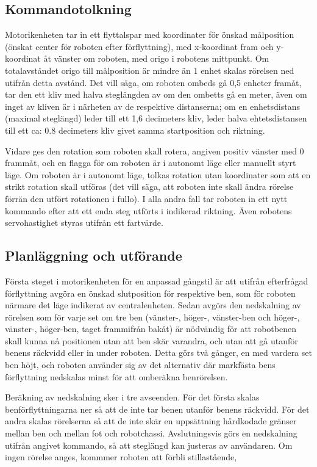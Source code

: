 \documentclass[a4paper,titlepage,12pt]{article}
\begin{document}
		\subsection{Kommandotolkning}
	Motorikenheten  tar in ett flyttalspar med koordinater för önskad målposition (önskat 
	center för roboten efter förflyttning), med x-koordinat fram och 
	y-koordinat åt vänster om roboten, med origo i robotens mittpunkt. Om totalavståndet 
	origo till målposition är mindre än 1 enhet skalas rörelsen ned utifrån detta avstånd. 
	Det vill säga, om roboten ombeds gå 0,5 enheter framåt, tar den ett kliv med halva 
	steglängden av om den ombetts gå en meter, även om inget av kliven är i närheten av 
	de respektive distanserna; om en enhetsdistans (maximal steglängd) leder till ett 
	1,6 decimeters kliv, leder halva ehtetsdistansen till ett ca: 0.8 decimeters kliv givet samma 
	startposition och riktning. 
	
	Vidare ges den rotation som roboten 
	skall rotera, angiven positiv vänster med 0 frammåt, och en flagga för om 
	roboten är i autonomt läge eller manuellt styrt läge. Om roboten är i autonomt läge, tolkas 
	rotation utan koordinater som att en strikt rotation skall utföras (det vill säga, att 
	roboten inte skall ändra rörelse förrän den utfört rotationen i fullo). I alla andra fall 
	tar roboten in ett nytt kommando efter att ett enda steg utförts i indikerad riktning. 
	Även robotens servohastighet styras utifrån ett fartvärde. 

		\subsection{Planläggning och utförande}
	Första steget i motorikenheten för en anpassad gångstil är att utifrån efterfrågad
	förflyttning avgöra en önskad slutposition för respektive ben, som för roboten närmare 
	det läge indikerat av centralenheten. Sedan avgörs den nedskalning av rörelsen som för 
	varje set om tre ben (vänster-, höger-, vänster-ben och höger-, vänster-, höger-ben, taget 
	frammifrån bakåt) är nödvändig för att robotbenen skall kunna nå positionen utan att ben 
	skär varandra, och utan att gå utanför benens räckvidd eller in under roboten. Detta görs 
	två gånger, en med vardera set ben höjt, och roboten använder sig av det alternativ där 
	markfästa bens förflyttning nedskalas minst för att omberäkna benrörelsen. 

	Beräkning av nedskalning sker i tre avseenden. För det första skalas benförflyttningarna 
	ner så att de inte tar benen utanför benens räckvidd. För det andra skalas  rörelserna så 
	att de inte skär en uppsättning hårdkodade gränser mellan ben och mellan fot och robotchassi.
	Avslutningsvis görs en nedskalning utifrån angivet kommando, så att steglängd kan justeras av 
	användaren. Om ingen rörelse anges, kommmer roboten att förbli stillastående, %
\end{document}
